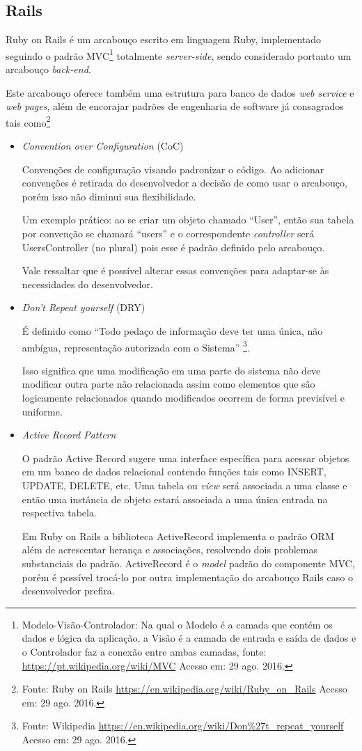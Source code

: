 \subsection{Rails}
\par Ruby on Rails é um arcabouço escrito em linguagem Ruby, implementado seguindo o padrão MVC\footnote{Modelo-Visão-Controlador: Na qual o Modelo é a camada que contém os dados e lógica da aplicação, a Visão é a camada de entrada e saída de dados e o Controlador faz a conexão entre ambas camadas, fonte: \url{https://pt.wikipedia.org/wiki/MVC} Acesso em: 29 ago. 2016.} totalmente \emph{server-side}, sendo considerado portanto um arcabouço \emph{back-end}.
\par Este arcabouço oferece também uma estrutura para banco de dados \emph{web service} e \emph{web pages}, além de encorajar padrões de engenharia de software já consagrados tais como\footnote{Fonte: Ruby on Rails \url{https://en.wikipedia.org/wiki/Ruby_on_Rails} Acesso em: 29 ago. 2016.}
\begin{itemize}
\item {\emph{Convention over Configuration} (CoC)}
    \par Convenções de configuração visando padronizar o código. Ao adicionar convenções é retirada do desenvolvedor a decisão de como usar o arcabouço, porém isso não diminui sua flexibilidade.
    \par Um exemplo prático: ao se criar um objeto chamado ``User'', então sua tabela por convenção se chamará ``users'' e o correspondente \emph{controller} será UsersController (no plural) pois esse é padrão definido pelo arcabouço.
    \par Vale ressaltar que é possível alterar essas convenções para adaptar-se às necessidades do desenvolvedor.

\item {\emph{Don't Repeat yourself} (DRY)}
    \par É definido como ``Todo pedaço de informação deve ter uma única, não ambígua, representação autorizada com o Sistema'' \footnote{Fonte: Wikipedia \url{https://en.wikipedia.org/wiki/Don\%27t_repeat_yourself} Acesso em: 29 ago. 2016.}.
    \par Isso significa que uma modificação em uma parte do sistema não deve modificar outra parte não relacionada assim como elementos que são logicamente relacionados quando modificados ocorrem de forma previsível e uniforme.

\item { \emph{Active Record Pattern}}
    \par O padrão Active Record sugere uma interface específica para acessar objetos em um banco de dados relacional contendo funções tais como INSERT, UPDATE, DELETE, etc. Uma tabela ou \emph{view} será associada a uma classe e então uma instância de objeto estará associada a uma única entrada na respectiva tabela.
    \par Em Ruby on Rails a biblioteca ActiveRecord implementa o padrão ORM além de acrescentar herança e associações, resolvendo dois problemas substanciais do padrão. ActiveRecord é o \emph{model} padrão do componente MVC, porém é possível trocá-lo por outra implementação do arcabouço Rails caso o desenvolvedor prefira.
\end{itemize}
